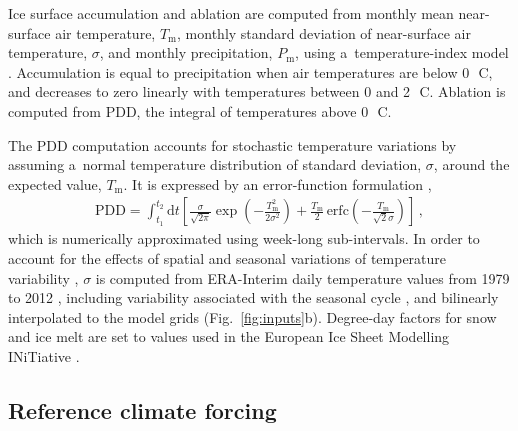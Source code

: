 \documentclass[tc, manuscript]{copernicus}
\begin{document}
    Ice surface accumulation and ablation are computed from monthly mean
    near-surface air temperature, $T_{\mathrm{m}}$, monthly standard deviation
    of near-surface air temperature, $\sigma$, and monthly precipitation,
    $P_{\mathrm{m}}$, using a~temperature-index model
    \citep[e.g.,][]{Hock.2003}. Accumulation is equal to precipitation when air
    temperatures are below 0\,\unit{{\degree}C}, and decreases to zero linearly
    with temperatures between 0 and 2\,\unit{{\degree}C}. Ablation is computed
    from PDD, the integral of temperatures above 0\,\unit{{\degree}C}.

    The PDD computation accounts for stochastic temperature variations by
    assuming a~normal temperature distribution of standard deviation, $\sigma$,
    around the expected value, $T_{\mathrm{m}}$. It is expressed by an
    error-function formulation \citep{Calov.Greve.2005},
    \begin{align}
      {\text{PDD}} = \int_{t_1}^{t_2} \mathrm{d}t
        \left[\frac{\sigma}{\sqrt{2\pi}}
                \exp\left({-\frac{T_{\mathrm{m}}^2}{2\sigma^2}}\right)
              + \frac{T_{\mathrm{m}}}{2} \, {\text{erfc}}
                \left(-\frac{T_{\mathrm{m}}}{\sqrt{2}\sigma}\right)\right] \,,
    \end{align}
    which is numerically approximated using week-long sub-intervals. In
    order to account for the effects of spatial and seasonal variations of
    temperature variability \citep{Seguinot.2013}, $\sigma$ is computed
    from ERA-Interim daily temperature values from 1979 to 2012
    \citep{Mesinger.etal.2006}, including variability associated with the
    seasonal cycle \citep{Seguinot.2013}, and bilinearly interpolated to the
    model grids (Fig.~\ref{fig:inputs}b). Degree-day factors for snow and ice
    melt are set to values used in the European Ice Sheet Modelling INiTiative
    \citep[Table~\ref{tab:params}; EISMINT,][]{Huybrechts.1998}.


\subsection{Reference climate forcing}
\label{sec:atm}
\end{document}
